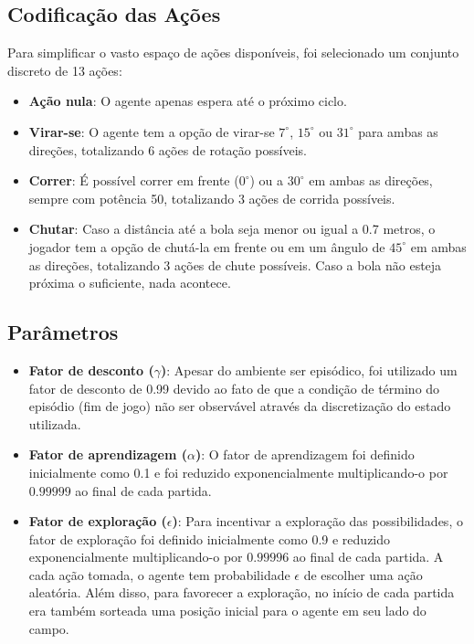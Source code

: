 \subsection{Codificação das Ações}

Para simplificar o vasto espaço de ações disponíveis, foi selecionado um conjunto discreto de 13 ações:

\begin{itemize}
    \item \textbf{Ação nula}: O agente apenas espera até o próximo ciclo.

    \item \textbf{Virar-se}: O agente tem a opção de virar-se $7^{\circ}$, $15^{\circ}$ ou $31^{\circ}$ para ambas as direções, totalizando 6 ações de rotação possíveis. 
    
    \item \textbf{Correr}: É possível correr em frente ($0^{\circ}$) ou a $30^{\circ}$ em ambas as direções, sempre com potência 50, totalizando 3 ações de corrida possíveis.

    \item \textbf{Chutar}: Caso a distância até a bola seja menor ou igual a 0.7 metros, o jogador tem a opção de chutá-la em frente ou em um ângulo de $45^{\circ}$ em ambas as direções, totalizando 3 ações de chute possíveis. Caso a bola não esteja próxima o suficiente, nada acontece.
\end{itemize}

\subsection{Parâmetros}

\begin{itemize}
    \item \textbf{Fator de desconto ($\gamma$)}: Apesar do ambiente ser episódico, foi utilizado um fator de desconto de 0.99 devido ao fato de que a condição de término do episódio (fim de jogo) não ser observável através da discretização do estado utilizada.  

    \item \textbf{Fator de aprendizagem ($\alpha$)}: O fator de aprendizagem foi definido inicialmente como 0.1 e foi reduzido exponencialmente multiplicando-o por $0.99999$ ao final de cada partida. 
    
    \item \textbf{Fator de exploração ($\epsilon$)}: Para incentivar a exploração das possibilidades, o fator de exploração foi definido inicialmente como 0.9 e reduzido exponencialmente multiplicando-o por $0.99996$ ao final de cada partida. A cada ação tomada, o agente tem probabilidade $\epsilon$ de escolher uma ação aleatória. Além disso, para favorecer a exploração, no início de cada partida era também sorteada uma posição inicial para o agente em seu lado do campo.
\end{itemize}

